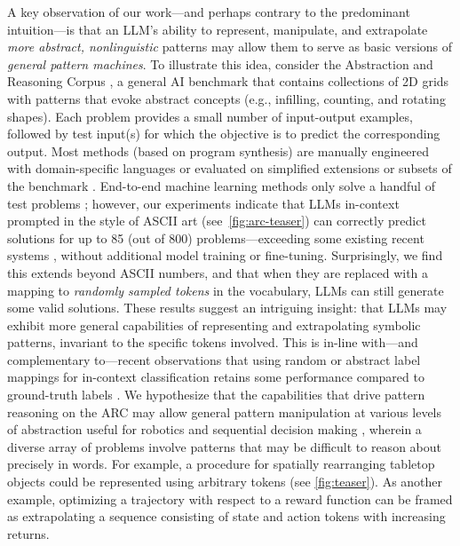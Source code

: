 \documentclass{article}
\newcommand{\eg}{e.g., }
\begin{document}
A key observation of our work---and perhaps contrary to the predominant intuition---is that an LLM's ability to represent, manipulate, and extrapolate \textit{more abstract, nonlinguistic} patterns may allow them to serve as basic versions of \textit{general pattern machines}. To illustrate this idea, consider the Abstraction and Reasoning Corpus \cite{chollet2019measure}, a general AI benchmark that contains collections of 2D grids with patterns that evoke abstract concepts (\eg infilling, counting, and rotating shapes). Each problem provides a small number of input-output examples, followed by test input(s) for which the objective is to predict the corresponding output. Most methods (based on program synthesis) are manually engineered with domain-specific languages \cite{ferre2021first,xu2022graphs,ainooson2023approach,alford2021neurosymbolic} or evaluated on simplified extensions or subsets of the benchmark \cite{assouel2022object,moskvichev2023conceptarc,kolev2020neural}. End-to-end machine learning methods only solve a handful of test problems \cite{paparaju2020arc}; however, our experiments indicate that LLMs in-context prompted in the style of ASCII art (see~\cref{fig:arc-teaser}) can correctly predict solutions for up to 85 (out of 800) problems---exceeding some existing recent systems \cite{ferre2021first,xu2022graphs,alford2021neurosymbolic}, without additional model training or fine-tuning. Surprisingly, we find this extends beyond ASCII numbers, and that when they are replaced with a mapping to \textit{randomly sampled tokens} in the vocabulary, LLMs can still generate some valid solutions. These results suggest an intriguing insight: that LLMs may exhibit more general capabilities of representing and extrapolating symbolic patterns, invariant to the specific tokens involved.
This is in-line with---and complementary to---recent observations that using random or abstract label mappings for in-context classification retains some performance compared to ground-truth labels \cite{min2022rethinking, pan2023context}.
We hypothesize that the capabilities that drive pattern reasoning on the ARC may allow general pattern manipulation at various levels of abstraction useful for robotics and sequential decision making \cite{lu2021pretrained,reid2022can}, wherein a diverse array of problems involve patterns that may be difficult to reason about precisely in words. For example, a procedure for spatially rearranging tabletop objects could be represented using arbitrary tokens (see \cref{fig:teaser}). As another example, optimizing a trajectory with respect to a reward function can be framed as extrapolating a sequence consisting of state and action tokens with increasing returns.
\end{document}
